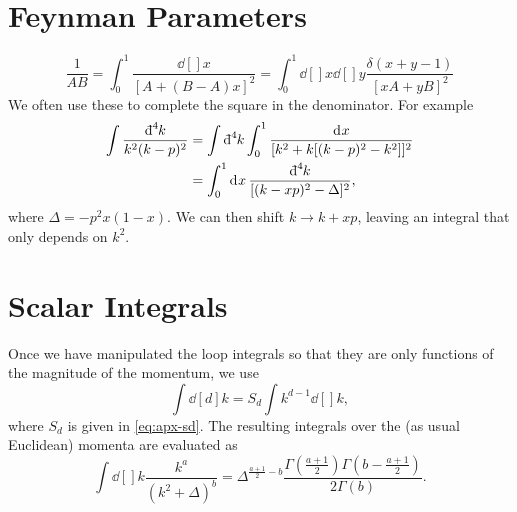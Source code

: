 \begin{appendices}
\section{Feynman Parameters}%
\label{sec:feynman_parameters}

\begin{equation}
  \frac{1}{A B} = \int_0^1 \frac{\dd[]{x}}{[A + (B - A) x]^2} = \int_0^1 \dd[]{x} \dd[]{y} \frac{\delta(x + y - 1)}{[x A + y B]^2}
\end{equation}
We often use these to complete the square in the denominator. For example
\begin{align}
  \int \frac{\bdd[4]{k}}{k^2 (k - p)^2} &= \int \bdd[4]{k} \int_0^1 \frac{\dd[]{x}}{[k^2 + k [(k - p)^2 - k^2]]^2} \\
					&= \int_0^1 \dd[]{x} \frac{\bdd[4]{k}}{[(k - xp)^2 - \Delta]^2},
\end{align}
where $\Delta = - p^2 x (1 - x)$. We can then shift $k \to k + xp$, leaving an integral that only depends on $k^2$.

\section{Scalar Integrals}%
\label{sec:scalar_integrals}

Once we have manipulated the loop integrals so that they are only functions of the magnitude of the momentum, we use
\begin{equation}
  \int \dd[d]{k} = S_d \int k^{d - 1} \dd[]{k},
\end{equation}
where $S_d$ is given in \eqref{eq:apx-sd}.
The resulting integrals over the (as usual Euclidean) momenta are evaluated as
\begin{equation}
  \int \dd[]{k} \frac{k^a}{(k^2 + \Delta)^b} = \Delta^{\frac{a + 1}{2} - b} \frac{\Gamma \left( \frac{a + 1}{2} \right) \Gamma \left( b - \frac{a + 1}{2} \right)}{2 \Gamma(b)}.
\end{equation}

\end{appendices}
